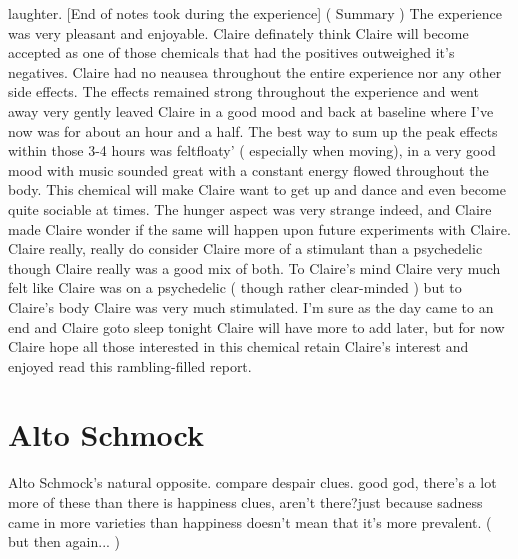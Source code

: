 \documentclass[12pt]{book}
\begin{document}
laughter. [End of notes took during the experience] ( Summary ) The experience was very pleasant and enjoyable. Claire definately think Claire will become accepted as one of those chemicals that had the positives outweighed it's negatives. Claire had no neausea throughout the entire experience nor any other side effects. The effects remained strong throughout the experience and went away very gently leaved Claire in a good mood and back at baseline where I've now was for about an hour and a half. The best way to sum up the peak effects within those 3-4 hours was feltfloaty' ( especially when moving), in a very good mood with music sounded great with a constant energy flowed throughout the body. This chemical will make Claire want to get up and dance and even become quite sociable at times. The hunger aspect was very strange indeed, and Claire made Claire wonder if the same will happen upon future experiments with Claire. Claire really, really do consider Claire more of a stimulant than a psychedelic though Claire really was a good mix of both. To Claire's mind Claire very much felt like Claire was on a psychedelic ( though rather clear-minded ) but to Claire's body Claire was very much stimulated. I'm sure as the day came to an end and Claire goto sleep tonight Claire will have more to add later, but for now Claire hope all those interested in this chemical retain Claire's interest and enjoyed read this rambling-filled report.



\chapter{Alto Schmock}

Alto Schmock's natural opposite. compare despair clues. good god, there's a lot more of these than there is happiness clues, aren't there?just because sadness came in more varieties than happiness doesn't mean that it's more prevalent. ( but then again... )
\end{document}

